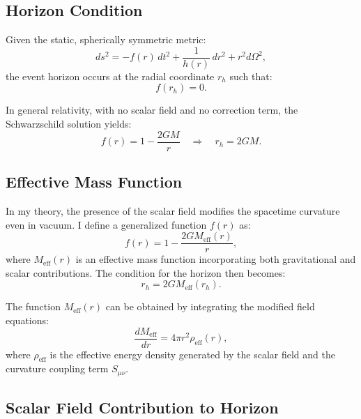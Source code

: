 \documentclass[12pt]{article}
\begin{document}
\subsection{Horizon Condition}

Given the static, spherically symmetric metric:
\begin{equation}
ds^2 = -f(r)\, dt^2 + \frac{1}{h(r)}\, dr^2 + r^2 d\Omega^2,
\end{equation}
the event horizon occurs at the radial coordinate \( r_h \) such that:
\begin{equation}
f(r_h) = 0.
\label{eq:horizon_condition}
\end{equation}

In general relativity, with no scalar field and no correction term, the Schwarzschild solution yields:
\begin{equation}
f(r) = 1 - \frac{2GM}{r} \quad \Rightarrow \quad r_h = 2GM.
\end{equation}

\subsection{Effective Mass Function}

In my theory, the presence of the scalar field modifies the spacetime curvature even in vacuum. I define a generalized function \( f(r) \) as:
\begin{equation}
f(r) = 1 - \frac{2G M_{\text{eff}}(r)}{r},
\end{equation}
where \( M_{\text{eff}}(r) \) is an effective mass function incorporating both gravitational and scalar contributions. The condition for the horizon then becomes:
\begin{equation}
r_h = 2G M_{\text{eff}}(r_h).
\label{eq:modified_horizon}
\end{equation}

The function \( M_{\text{eff}}(r) \) can be obtained by integrating the modified field equations:
\begin{equation}
\frac{dM_{\text{eff}}}{dr} = 4\pi r^2 \rho_{\text{eff}}(r),
\end{equation}
where \( \rho_{\text{eff}} \) is the effective energy density generated by the scalar field and the curvature coupling term \( S_{\mu\nu} \).

\subsection{Scalar Field Contribution to Horizon}
\end{document}
